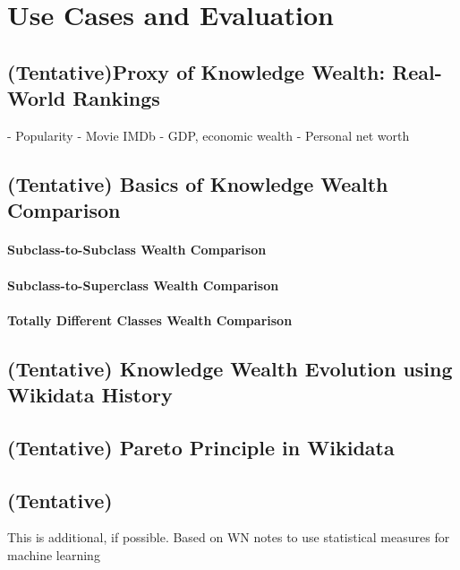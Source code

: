 \section{Use Cases and Evaluation}





\subsection{(Tentative)Proxy of Knowledge Wealth: Real-World Rankings}
- Popularity
- Movie IMDb
- GDP, economic wealth
- Personal net worth

\subsection{(Tentative) Basics of Knowledge Wealth Comparison}

\paragraph{Subclass-to-Subclass Wealth Comparison}
\paragraph{Subclass-to-Superclass Wealth Comparison}
\paragraph{Totally Different Classes Wealth Comparison}

\subsection{(Tentative) Knowledge Wealth Evolution using Wikidata History}

\subsection{(Tentative) Pareto Principle in Wikidata}

\subsection{(Tentative)}
This is additional, if possible. Based on WN notes to use statistical measures for machine learning